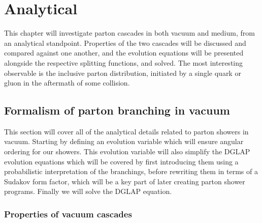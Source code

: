 \documentclass[main.tex]{subfiles}
\begin{document}
\chapter{Analytical}
This chapter will investigate parton cascades in both vacuum and medium, from an analytical standpoint. Properties of the two cascades will be discussed and compared against one another, and the evolution equations will be presented alongside the respective splitting functions, and solved.
The most interesting observable is the inclusive parton distribution, initiated by a single quark or gluon in the aftermath of some collision. 

\section{Formalism of parton branching in vacuum}
This section will cover all of the analytical details related to parton showers in vacuum. Starting by defining an evolution variable which will ensure angular ordering for our showers. This evolution variable will also simplify the DGLAP evolution equations which will be covered by first introducing them using a probabilistic interpretation of the branchings, before rewriting them in terms of a Sudakov form factor, which will be a key part of later creating parton shower programs. Finally we will solve the DGLAP equation. 

\subsection{Properties of vacuum cascades}
\end{document}
